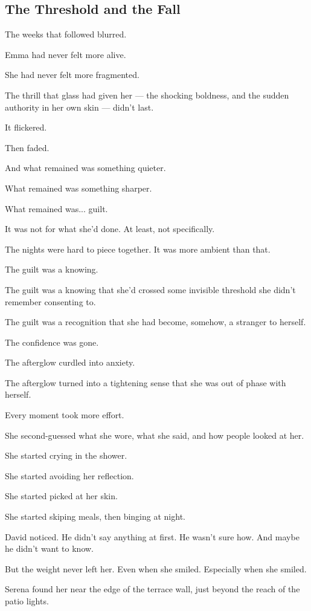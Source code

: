 
\subsection{The Threshold and the Fall}

The weeks that followed blurred.

Emma had never felt more alive.

She had never felt more fragmented. 

The thrill that glass had given her --- the shocking 
boldness, and the sudden authority in her own skin --- didn’t last.  

It flickered. 

Then faded. 

And what remained was something quieter. 

What remained was something sharper.

What remained was... guilt.

It was not for what she’d done. At least, not specifically. 

The nights were hard to piece together. 
It was more ambient than that. 

The guilt was a knowing. 

The guilt was a knowing that she'd crossed some invisible threshold she didn’t 
remember consenting to. 

The guilt was a recognition that she had become, somehow, a stranger to herself.

The confidence was gone.

The afterglow curdled into anxiety. 

The afterglow turned into a tightening sense that she was 
out of phase with herself. 

Every moment took more effort. 

She second-guessed what she wore, what she said, and how people looked at her. 

She started crying in the shower. 

She started avoiding her reflection. 

She started picked at her skin. 

She started skiping meals, then binging at night. 

David noticed. He didn’t say anything at first. He wasn’t sure how. And maybe he didn’t want to know. 

But the weight never left her. Even when she smiled. Especially when she smiled.

Serena found her near the edge of the terrace wall, just beyond the reach of the patio lights. 

